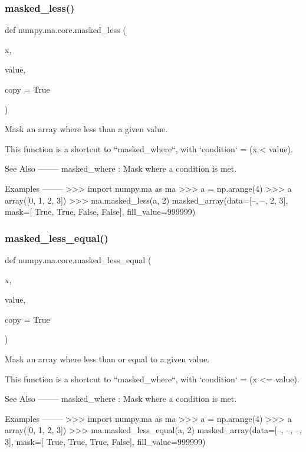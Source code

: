 \subsubsection{\texorpdfstring{masked\+\_\+less()}{masked\_less()}}
{\footnotesize\ttfamily def numpy.\+ma.\+core.\+masked\+\_\+less (\begin{DoxyParamCaption}\item[{}]{x,  }\item[{}]{value,  }\item[{}]{copy = {\ttfamily True} }\end{DoxyParamCaption})}

\begin{DoxyVerb}Mask an array where less than a given value.

This function is a shortcut to ``masked_where``, with
`condition` = (x < value).

See Also
--------
masked_where : Mask where a condition is met.

Examples
--------
>>> import numpy.ma as ma
>>> a = np.arange(4)
>>> a
array([0, 1, 2, 3])
>>> ma.masked_less(a, 2)
masked_array(data=[--, --, 2, 3],
             mask=[ True,  True, False, False],
       fill_value=999999)\end{DoxyVerb}
 \mbox{\label{namespacenumpy_1_1ma_1_1core_a612bd38a974042ae10103c95c9cacc16}} 
\subsubsection{\texorpdfstring{masked\+\_\+less\+\_\+equal()}{masked\_less\_equal()}}
{\footnotesize\ttfamily def numpy.\+ma.\+core.\+masked\+\_\+less\+\_\+equal (\begin{DoxyParamCaption}\item[{}]{x,  }\item[{}]{value,  }\item[{}]{copy = {\ttfamily True} }\end{DoxyParamCaption})}

\begin{DoxyVerb}Mask an array where less than or equal to a given value.

This function is a shortcut to ``masked_where``, with
`condition` = (x <= value).

See Also
--------
masked_where : Mask where a condition is met.

Examples
--------
>>> import numpy.ma as ma
>>> a = np.arange(4)
>>> a
array([0, 1, 2, 3])
>>> ma.masked_less_equal(a, 2)
masked_array(data=[--, --, --, 3],
             mask=[ True,  True,  True, False],
       fill_value=999999)\end{DoxyVerb}
 \mbox{\label{namespacenumpy_1_1ma_1_1core_ab70d2de830313407e90ce5a8e1fe51ba}} 
